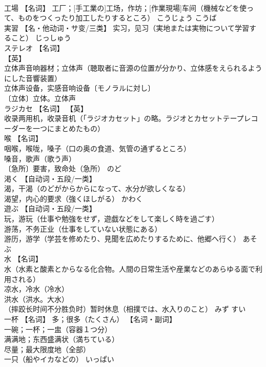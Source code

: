\documentclass[8pt]{extreport}
\begin{document}
\begin{CJK}{UTF8}{min}
\\	工場	【名词】 工厂；[手工業の]工场，作坊；[作業現場]车间（機械などを使って、ものをつくったり加工したりするところ）	こうじょう こうば	
\\	実習	【名・他动词・サ变/三类】 实习，见习（実地または実物について学習すること）	じっしゅう	
\\	ステレオ	【名词】 
\\	【英】
\\	立体声音响器材；立体声（聴取者に音源の位置が分かり、立体感をえられるようにした音響装置） 
\\	立体声设备，实感音响设备〔モノラルに対し〕 
\\	〔立体〕立体。立体声		
\\	ラジカセ	【名词】 【英】
\\	收录两用机，收录音机（「ラジオカセット」の略。ラジオとカセットテープレコーダーを一つにまとめたもの）		
\\	喉	【名词】 
\\	咽喉，喉咙，嗓子（口の奥の食道、気管の通ずるところ） 
\\	嗓音，歌声（歌う声） 
\\	〔急所〕要害，致命处（急所）	のど	
\\	渇く	【自动词・五段/一类】 
\\	渴，干渴（のどがからからになって、水分が欲しくなる） 
\\	渴望，内心的要求（強くほしがる）	かわく	
\\	遊ぶ	【自动词・五段/一类】 
\\	玩，游玩（仕事や勉強をせず，遊戯などをして楽しく時を過ごす） 
\\	游荡，不务正业（仕事をしていない状態にある） 
\\	游历，游学（学芸を修めたり、見聞を広めたりするために、他郷へ行く）	あそぶ	
\\	水	【名词】 
\\	水（水素と酸素とからなる化合物。人間の日常生活や産業などのあらゆる面で利用される） 
\\	凉水，冷水（冷水） 
\\	洪水（洪水。大水） 
\\	（摔跤长时间不分胜负时）暂时休息（相撲では、水入りのこと）	みず すい	
\\	一杯	【名词】 多；很多（たくさん） 【名词・副词】 
\\	一碗；一杯；一盅（容器１つ分） 
\\	满满地；东西盛满状（満ちている） 
\\	尽量；最大限度地（全部） 
\\	一只（船やイカなどの）	いっぱい	

\end{CJK}
\end{document}
